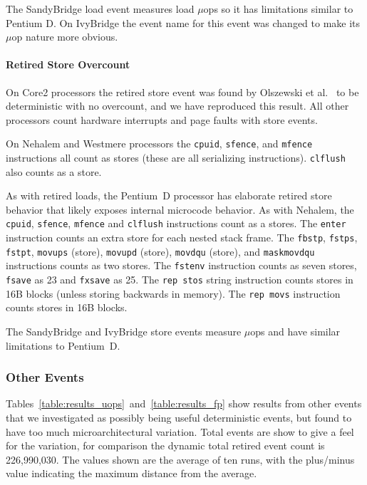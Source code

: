 The SandyBridge load event measures load $\mu$ops so it has
limitations similar to Pentium D.  
On IvyBridge the event name
for this event was changed to make its $\mu$op nature more obvious.

\paragraph{Retired Store Overcount}

On Core2 processors the retired store event 
was found by Olszewski et al.~\cite{olszewski+:asplos09} to be deterministic
with no overcount, and we have reproduced this result.
All other processors count hardware
interrupts and page faults with store events.

On Nehalem and Westmere processors the {\tt cpuid}, {\tt sfence}, 
and {\tt mfence} instructions all count as stores (these are all
serializing instructions).  {\tt clflush} also counts as a store.

As with retired loads, the Pentium~D processor has elaborate
retired store behavior that likely exposes internal microcode
behavior.  As with Nehalem, the {\tt cpuid}, {\tt sfence}, {\tt mfence} 
and {\tt clflush} instructions count as a stores.
The {\tt enter} instruction counts an extra store for each nested stack frame.
The {\tt fbstp}, {\tt fstps}, {\tt fstpt}, {\tt movups} (store),
{\tt movupd} (store), {\tt movdqu} (store), and {\tt maskmovdqu} 
instructions counts as two stores.  The {\tt fstenv} instruction counts as 
seven stores, {\tt fsave} as 23 and {\tt fxsave} as 25.
The {\tt rep stos} string instruction counts stores 
in 16B blocks (unless storing backwards in memory).
The {\tt rep movs} instruction counts stores in 16B blocks.

The SandyBridge and IvyBridge store events measure $\mu$ops 
and have similar limitations to Pentium~D.

\subsubsection{Other Events}

Tables~\ref{table:results_uops}~and~\ref{table:results_fp} show results
from other events that we investigated as possibly being useful
deterministic events, but found to have too much microarchitectural
variation.  Total events are show to give a feel for the variation,
for comparison the dynamic total retired event count is
226,990,030.  The values shown are the average of ten runs, with
the plus/minus value indicating the maximum distance from the average.


